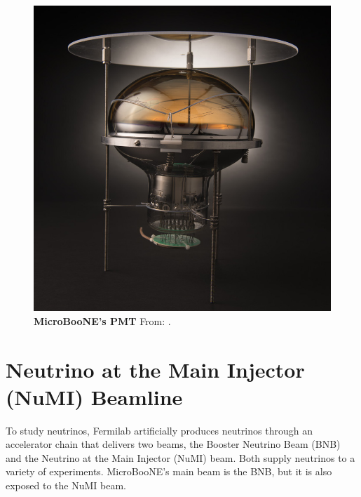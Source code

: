 \begin{figure}[h!]
    \begin{center}
        \includegraphics[scale=0.2]{Figures/microboone_pmt.jpeg}
        \caption[MicroBooNE's PMT]{{\textbf{MicroBooNE's PMT}} From: \cite{uboone_pmt}.}
        \label{uboone_pmt} 
    \end{center}
\end{figure}

\section{Neutrino at the Main Injector (NuMI) Beamline}

To study neutrinos, Fermilab artificially produces neutrinos through an accelerator chain that delivers two beams, the Booster Neutrino Beam (BNB) and the Neutrino at the Main Injector (NuMI) beam. Both supply neutrinos to a variety of experiments. MicroBooNE's main beam is the BNB,  but it is also exposed to the NuMI beam. 

